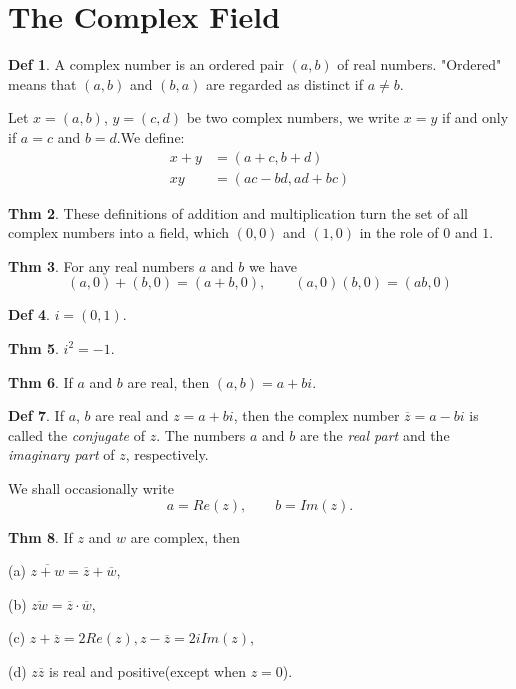 \documentclass{article}
\theoremstyle{definition}
\newtheorem{definition}{Def}
\newtheorem{theorem}[definition]{Thm}
\begin{document}
\section{The Complex Field}
\begin{definition}
    A complex number is an ordered pair $(a, b)$ of real numbers. "Ordered" means that $(a, b)$ and $(b, a)$ are regarded as distinct if $a\neq b$.\par
    Let $x=(a, b)$, $y=(c, d)$ be two complex numbers, we write $x=y$ if and only if $a=c$ and $b=d$.We define:
    \[
    \begin{aligned}
        x+y&=(a+c, b+d) \\
        xy&=(ac-bd, ad+bc)
    \end{aligned}
    \]
\end{definition}
\begin{theorem}
    These definitions of addition and multiplication turn the set of all complex numbers into a field, which $(0, 0)$ and $(1, 0)$ in the role of $0$ and $1$.
\end{theorem}
\begin{theorem}
    For any real numbers $a$ and $b$ we have
    \[
    (a, 0) + (b, 0) = (a+b, 0),\qquad (a, 0)(b, 0)= (ab, 0)
    \]
\end{theorem}
\begin{definition}
    $i=(0, 1)$.
\end{definition}
\begin{theorem}
    $i^2=-1$.
\end{theorem}
\begin{theorem}
    If $a$ and $b$ are real, then $(a, b)=a+bi$.
\end{theorem}
\begin{definition}
    If $a$, $b$ are real and $z = a+bi$, then the complex number $\overline{z}=a-bi$ is called the \textit{conjugate} of $z$. The numbers $a$ and $b$ are the \textit{real part} and the \textit{imaginary part} of $z$, respectively.\par
    We shall occasionally write
    \[
    a=Re(z),\qquad b=Im(z).
    \]
\end{definition}
\begin{theorem}
    If $z$ and $w$ are complex, then\par
    (a) $\overline{z+w}=\overline{z}+\overline{w}$,\par
    (b) $\overline{zw}=\overline{z}\cdot\overline{w}$,\par
    (c) $z+\overline{z}=2Re(z),z-\overline{z}=2iIm(z)$,\par
    (d) $z\overline{z}$ is real and positive(except when $z=0$).
\end{theorem}
\end{document}
